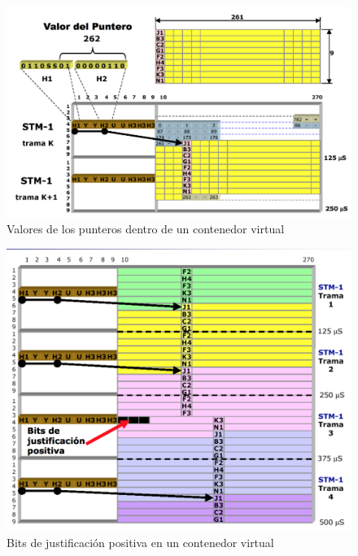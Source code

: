 \documentclass[10pt,portrait, twocolumn]{article}
\begin{document}
	\begin{figure}[!ht]
 		\centering
  		 \includegraphics[scale = 0.4]{images/VC2}
		\caption{Valores de los punteros dentro de un contenedor virtual}
	\end{figure}
	
	\begin{figure}[!ht]
 		\centering
  		 \includegraphics[scale = 0.4]{images/VCPosit}
		\caption{Bits de justificación positiva en un contenedor virtual}
	\end{figure}
	
\end{document}
